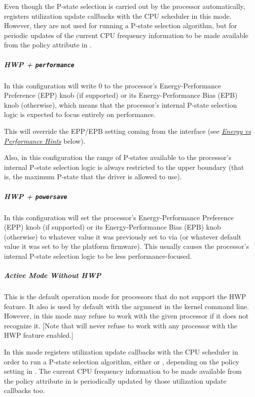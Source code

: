 \documentclass[a4paper,8pt,english]{sphinxmanual}
\begin{document}
Even though the P-state selection is carried out by the processor automatically,
 registers utilization update callbacks with the CPU scheduler
in this mode.  However, they are not used for running a P-state selection
algorithm, but for periodic updates of the current CPU frequency information to
be made available from the  policy attribute in .


\subparagraph{HWP + \texttt{performance}}
\label{admin-guide/pm/intel_pstate:hwp-performance}
In this configuration  will write 0 to the processor's
Energy-Performance Preference (EPP) knob (if supported) or its
Energy-Performance Bias (EPB) knob (otherwise), which means that the processor's
internal P-state selection logic is expected to focus entirely on performance.

This will override the EPP/EPB setting coming from the  interface
(see {\hyperref[admin\string-guide/pm/intel_pstate:energy\string-vs\string-performance\string-hints]{\emph{Energy vs Performance Hints}}} below).

Also, in this configuration the range of P-states available to the processor's
internal P-state selection logic is always restricted to the upper boundary
(that is, the maximum P-state that the driver is allowed to use).


\subparagraph{HWP + \texttt{powersave}}
\label{admin-guide/pm/intel_pstate:hwp-powersave}
In this configuration  will set the processor's
Energy-Performance Preference (EPP) knob (if supported) or its
Energy-Performance Bias (EPB) knob (otherwise) to whatever value it was
previously set to via  (or whatever default value it was
set to by the platform firmware).  This usually causes the processor's
internal P-state selection logic to be less performance-focused.


\subparagraph{Active Mode Without HWP}
\label{admin-guide/pm/intel_pstate:active-mode-without-hwp}
This is the default operation mode for processors that do not support the HWP
feature.  It also is used by default with the  argument
in the kernel command line.  However, in this mode  may refuse
to work with the given processor if it does not recognize it.  {[}Note that
 will never refuse to work with any processor with the HWP
feature enabled.{]}

In this mode  registers utilization update callbacks with the
CPU scheduler in order to run a P-state selection algorithm, either
 or , depending on the  policy
setting in .  The current CPU frequency information to be made
available from the  policy attribute in  is
periodically updated by those utilization update callbacks too.
\end{document}

